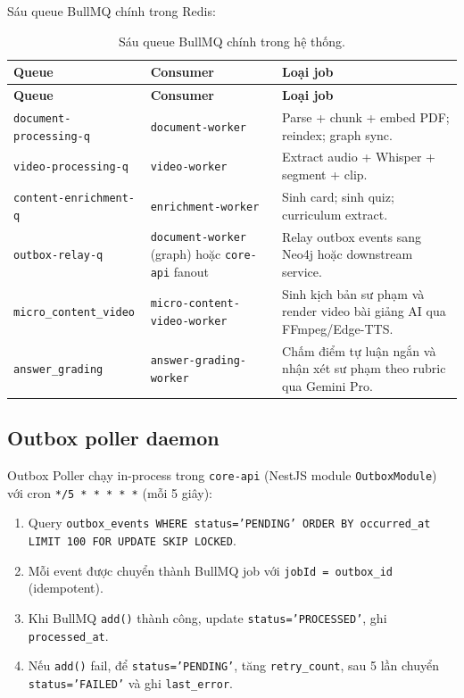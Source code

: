Sáu queue BullMQ chính trong Redis:

\begin{longtable}{|p{4.2cm}|p{3.8cm}|p{5.5cm}|}
\caption{Sáu queue BullMQ chính trong hệ thống.}
\label{tab:bullmq-queues} \\
\hline
\textbf{Queue} & \textbf{Consumer} & \textbf{Loại job} \\
\hline
\endfirsthead
\hline
\textbf{Queue} & \textbf{Consumer} & \textbf{Loại job} \\
\hline
\endhead

\texttt{document-processing-q} & \texttt{document-worker}
    & Parse + chunk + embed PDF; reindex; graph sync. \\
\hline
\texttt{video-processing-q} & \texttt{video-worker}
    & Extract audio + Whisper + segment + clip. \\
\hline
\texttt{content-enrichment-q} & \texttt{enrichment-worker}
    & Sinh card; sinh quiz; curriculum extract. \\
\hline
\texttt{outbox-relay-q} & \texttt{document-worker} (graph) hoặc
    \texttt{core-api} fanout
    & Relay outbox events sang Neo4j hoặc downstream service. \\
\hline
\texttt{micro\_content\_video} & \texttt{micro-content-video-worker}
    & Sinh kịch bản sư phạm và render video bài giảng AI qua FFmpeg/Edge-TTS. \\
\hline
\texttt{answer\_grading} & \texttt{answer-grading-worker}
    & Chấm điểm tự luận ngắn và nhận xét sư phạm theo rubric qua Gemini Pro. \\
\hline
\end{longtable}

\subsection{Outbox poller daemon}

Outbox Poller chạy in-process trong \texttt{core-api} (NestJS module
\texttt{OutboxModule}) với cron \texttt{*/5 * * * * *} (mỗi 5 giây):

\begin{enumerate}
    \item Query \texttt{outbox\_events WHERE status='PENDING' ORDER BY
          occurred\_at LIMIT 100 FOR UPDATE SKIP LOCKED}.
    \item Mỗi event được chuyển thành BullMQ job với
          \texttt{jobId = outbox\_id} (idempotent).
    \item Khi BullMQ \texttt{add()} thành công, update
          \texttt{status='PROCESSED'}, ghi
          \texttt{processed\_at}.
    \item Nếu \texttt{add()} fail, để \texttt{status='PENDING'}, tăng
          \texttt{retry\_count}, sau 5 lần chuyển
          \texttt{status='FAILED'} và ghi \texttt{last\_error}.
\end{enumerate}

